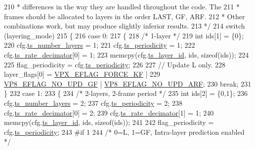 \begin{DoxyCodeInclude}
{{{{{{{{{{{{{{{210 \textcolor{comment}{     * differences in the way they are handled throughout the code. The}
211 \textcolor{comment}{     * frames should be allocated to layers in the order LAST, GF, ARF.}
212 \textcolor{comment}{     * Other combinations work, but may produce slightly inferior results.}
213 \textcolor{comment}{     */}
214     \textcolor{keywordflow}{switch} (layering\_mode)
215     \{
216     \textcolor{keywordflow}{case} 0:
217     \{
218         \textcolor{comment}{/* 1-layer */}
219        \textcolor{keywordtype}{int} ids[1] = \{0\};
220        cfg.\hyperlink{structvpx__codec__enc__cfg_a16d4549a30cbd585e3c3056ef873d8c7}{ts\_number\_layers}     = 1;
221        cfg.\hyperlink{structvpx__codec__enc__cfg_a4ec338780115dd270acf0dac24193474}{ts\_periodicity}       = 1;
222        cfg.\hyperlink{structvpx__codec__enc__cfg_ad40c30846ef8ef1d8684f10a491ec535}{ts\_rate\_decimator}[0] = 1;
223        memcpy(cfg.\hyperlink{structvpx__codec__enc__cfg_a4d105d2470dbfb7210b33d298f1cf1f6}{ts\_layer\_id}, ids, \textcolor{keyword}{sizeof}(ids));
224 
225        flag\_periodicity = cfg.\hyperlink{structvpx__codec__enc__cfg_a4ec338780115dd270acf0dac24193474}{ts\_periodicity};
226 
227        \textcolor{comment}{// Update L only.}
228        layer\_flags[0] = \hyperlink{group__encoder_ga4c4f4e3cbb5225d2c6c050e2d1e948fa}{VPX\_EFLAG\_FORCE\_KF}  |
229                         \hyperlink{group__vp8__encoder_gab01d066c5236457d345ce1cab4c41d6b}{VP8\_EFLAG\_NO\_UPD\_GF} | 
      \hyperlink{group__vp8__encoder_ga1cff46a5287e73a620660030d40b9e6c}{VP8\_EFLAG\_NO\_UPD\_ARF};
230        \textcolor{keywordflow}{break};
231     \}
232     \textcolor{keywordflow}{case} 1:
233     \{
234         \textcolor{comment}{/* 2-layers, 2-frame period */}
235         \textcolor{keywordtype}{int} ids[2] = \{0,1\};
236         cfg.\hyperlink{structvpx__codec__enc__cfg_a16d4549a30cbd585e3c3056ef873d8c7}{ts\_number\_layers}     = 2;
237         cfg.\hyperlink{structvpx__codec__enc__cfg_a4ec338780115dd270acf0dac24193474}{ts\_periodicity}       = 2;
238         cfg.\hyperlink{structvpx__codec__enc__cfg_ad40c30846ef8ef1d8684f10a491ec535}{ts\_rate\_decimator}[0] = 2;
239         cfg.\hyperlink{structvpx__codec__enc__cfg_ad40c30846ef8ef1d8684f10a491ec535}{ts\_rate\_decimator}[1] = 1;
240         memcpy(cfg.\hyperlink{structvpx__codec__enc__cfg_a4d105d2470dbfb7210b33d298f1cf1f6}{ts\_layer\_id}, ids, \textcolor{keyword}{sizeof}(ids));
241 
242         flag\_periodicity = cfg.\hyperlink{structvpx__codec__enc__cfg_a4ec338780115dd270acf0dac24193474}{ts\_periodicity};
243 \textcolor{preprocessor}{#if 1}
244         \textcolor{comment}{/* 0=L, 1=GF, Intra-layer prediction enabled */}
}}}}}}}}}}}}}}}
\end{DoxyCodeInclude}
